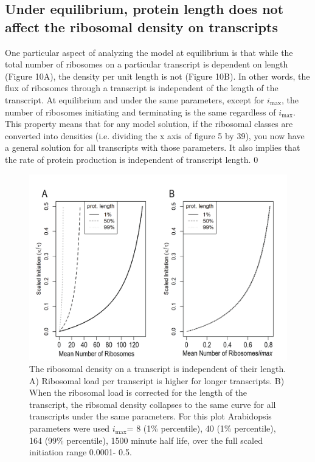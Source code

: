 \documentclass[review]{elsarticle}
\newcommand{\imax}{\ensuremath{{i_{\max}}}\xspace}
\begin{document}
\subsection{Under equilibrium, protein length does not affect the ribosomal density on transcripts}
One particular aspect of analyzing the model at equilibrium is that while the total number of ribosomes on a particular transcript is dependent on length (Figure 10A), the density per unit length is not (Figure 10B). In other words, the flux of ribosomes through a transcript is independent of the length of the transcript. At equilibrium and under the same parameters, except for \imax, the number of ribosomes initiating and terminating is the same regardless of \imax. This property means that for any model solution, if the ribosomal classes are converted into densities (i.e. dividing the x axis of figure 5 by 39), you now have a general solution for all transcripts with those parameters. It also implies that the rate of protein production is independent of transcript length. 0


\begin{figure}[!ht]
\centering
\includegraphics[width=120mm]{Images/2023-07-04_length_independence.png}
\caption{The ribosomal density on a transcript is independent of their length. A) Ribosomal load per transcript is higher for longer transcripts. B) When the ribosomal load is corrected for the length of the transcript, the ribsomal density collapses to the same curve for all transcripts under the same parameters. For this plot Arabidopsis parameters were used \imax =  8 (1\% percentile),  40 (1\% percentile), 164 (99\% percentile), 1500 minute half life, over the full scaled initiation range 0.0001- 0.5.}
\end{figure}
\clearpage
\end{document}
